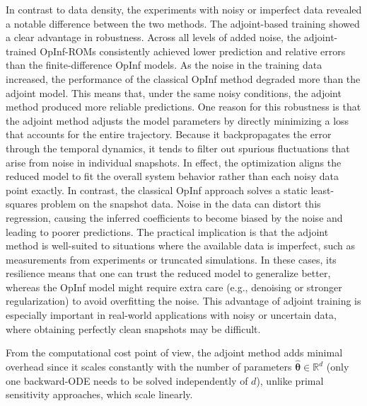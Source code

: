 In contrast to data density, the experiments with noisy or imperfect data revealed a notable difference between the two methods. The adjoint-based training showed a clear advantage in robustness. Across all levels of added noise, the adjoint-trained OpInf-ROMs consistently achieved lower prediction and relative errors than the finite-difference OpInf models. As the noise in the training data increased, the performance of the classical OpInf method degraded more than the adjoint model. This means that, under the same noisy conditions, the adjoint method produced more reliable predictions. One reason for this robustness is that the adjoint method adjusts the model parameters by directly minimizing a loss that accounts for the entire trajectory. Because it backpropagates the error through the temporal dynamics, it tends to filter out spurious fluctuations that arise from noise in individual snapshots. In effect, the optimization aligns the reduced model to fit the overall system behavior rather than each noisy data point exactly. In contrast, the classical OpInf approach solves a static least-squares problem on the snapshot data. Noise in the data can distort this regression, causing the inferred coefficients to become biased by the noise and leading to poorer predictions. The practical implication is that the adjoint method is well-suited to situations where the available data is imperfect, such as measurements from experiments or truncated simulations. In these cases, its resilience means that one can trust the reduced model to generalize better, whereas the OpInf model might require extra care (e.g., denoising or stronger regularization) to avoid overfitting the noise. This advantage of adjoint training is especially important in real-world applications with noisy or uncertain data, where obtaining perfectly clean snapshots may be difficult.


From the computational cost point of view, the adjoint method adds minimal overhead since it scales constantly with the number of parameters $\hat{\bm{\theta}}\in\mathbb{R}^d$ (only one backward-ODE needs to be solved independently of $d$), unlike primal sensitivity approaches, which scale linearly.


